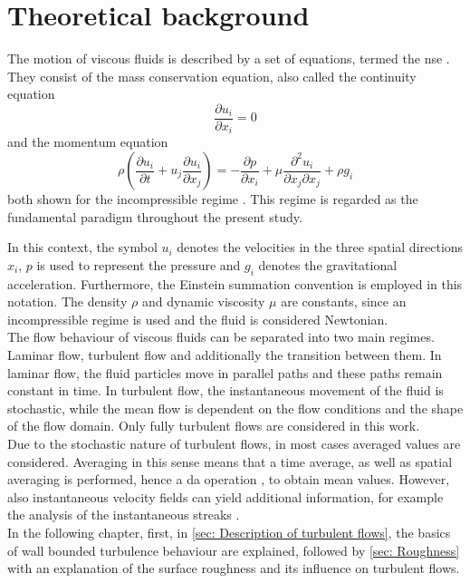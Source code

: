 \chapter{Theoretical background}\label{chap: Theory}
The motion of viscous fluids is described by a set of  equations, termed the \acrfull{nse} \citep{schlichtingBoundaryLayerTheory2017}.
They consist of the mass conservation equation, also called the continuity equation
\begin{equation}\label{eq: conservation equation}
    \frac{\partial u_i}{\partial x_i} = 0
\end{equation}
and the momentum equation
\begin{equation}\label{eq: momentum equation}
    \rho \left(\frac{\partial u_i}{\partial t} + u_j \frac{\partial u_i}{\partial x_j}\right) = -\frac{\partial p}{\partial x_i} + \mu\frac{\partial^2 u_i}{\partial x_j \partial x_j} + \rho g_i
\end{equation}
both shown for the incompressible regime \citep{schlichtingBoundaryLayerTheory2017}. This regime is regarded as the fundamental paradigm throughout the present study.

In this context, the symbol  $u_i$ denotes the velocities in the three spatial directions $x_i$, $p$  is used to represent the pressure and $g_i$ denotes
the gravitational acceleration.
Furthermore,  the Einstein summation convention is employed in this notation.
The density $\rho$ and dynamic viscosity $\mu$ are constants, since an incompressible regime is used and the fluid is considered Newtonian.\\
The flow behaviour of viscous fluids can be separated into two main regimes.
Laminar flow, turbulent flow and additionally the transition between them.
In laminar flow, the fluid particles move in parallel paths and these paths remain constant in time. 
In turbulent flow, the instantaneous movement of the fluid is stochastic, while the mean flow is dependent on the flow conditions and the shape of the flow domain.
Only fully turbulent flows are considered in this work.\\
Due to the stochastic nature of turbulent flows, in most cases averaged values are considered.
Averaging in this sense means that a time average, as well as spatial averaging is performed, hence a \acrfull{da} operation \citep{raupachAveragingProceduresFlow1982}, to obtain mean values.
However, also instantaneous velocity fields can yield additional information, for example the analysis of the instantaneous streaks \citep{yaoDirectNumericalSimulations2023}.\\
In the following chapter, first, in \autoref{sec: Description of turbulent flows}, the basics of wall bounded turbulence behaviour are explained, followed by \autoref{sec: Roughness} with an explanation of the surface roughness and its influence on turbulent flows.

